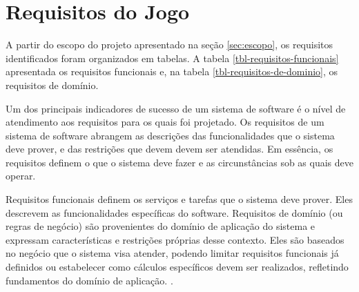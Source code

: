 \section{Requisitos do Jogo}
\label{sec:requisitos-do-jogo}
A partir do escopo do projeto apresentado na seção \ref{sec:escopo}, os requisitos identificados foram organizados em tabelas. A tabela \ref{tbl-requisitos-funcionais} apresentada os requisitos funcionais e, na tabela \ref{tbl-requisitos-de-dominio}, os requisitos de domínio.

Um dos principais indicadores de sucesso de um sistema de software é o nível de atendimento aos requisitos para os quais foi projetado. Os requisitos de um sistema de software abrangem as descrições das funcionalidades que o sistema deve prover, e das restrições que devem devem ser atendidas. Em essência, os requisitos definem o que o sistema deve fazer e as
circunstâncias sob as quais deve operar. \cite{sommervilleengenharia}

Requisitos funcionais definem os serviços e tarefas que o sistema deve prover. Eles descrevem as funcionalidades específicas do software. Requisitos de domínio (ou regras de negócio) são provenientes do domínio de aplicação do sistema e expressam características e restrições próprias desse contexto. Eles são baseados no negócio que o sistema visa atender, podendo limitar requisitos funcionais já definidos ou estabelecer como cálculos específicos devem ser realizados, refletindo fundamentos do domínio de aplicação. \cite{sommervilleengenharia}.

